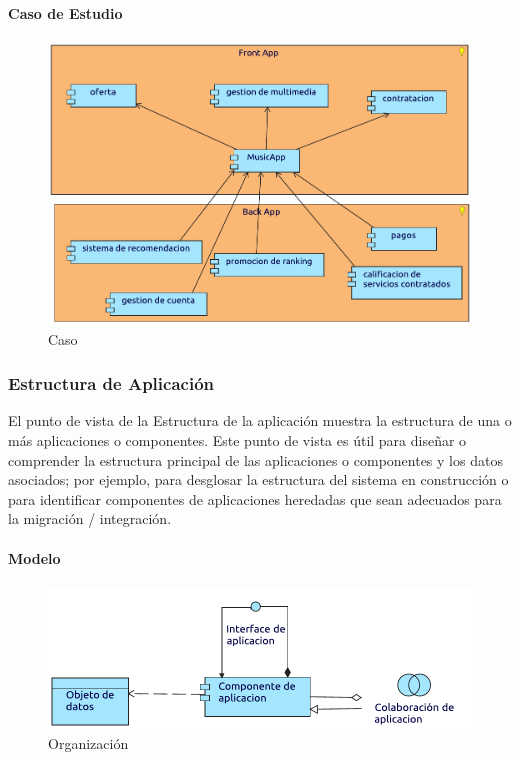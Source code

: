 \paragraph{Caso de Estudio}

\begin{figure}[h!]
	\centering
	\includegraphics[width=\linewidth]{Desarrollo/ArquitecturaEmpresarial/Aplicacion/imgs/Cooperacion.pdf}
	\caption{Caso}
\end{figure}

\newpage

\subsubsection{Estructura de Aplicación}
El punto de vista de la Estructura de la aplicación muestra la estructura de una o más aplicaciones o componentes. Este punto de vista es útil para diseñar o comprender la estructura principal de las aplicaciones o componentes y los datos asociados; por ejemplo, para desglosar la estructura del sistema en construcción o para identificar componentes de aplicaciones heredadas que sean adecuados para la migración / integración.
\paragraph{Modelo}
\begin{figure}[h!]
	\centering
	\includegraphics[width=\linewidth]{Desarrollo/ArquitecturaEmpresarial/Aplicacion/imgs/estructuraMetamodelo.pdf}
	\caption{Organización}
\end{figure}
\newpage
